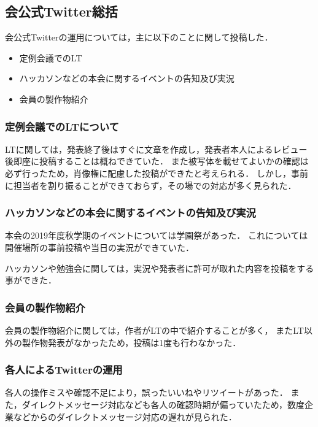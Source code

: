 \subsection*{会公式Twitter総括}


会公式Twitterの運用については，主に以下のことに関して投稿した．
\begin{itemize}
\item 定例会議でのLT
\item ハッカソンなどの本会に関するイベントの告知及び実況
\item 会員の製作物紹介
\end{itemize}

\subsubsection*{定例会議でのLTについて}
LTに関しては，発表終了後はすぐに文章を作成し，発表者本人によるレビュー後即座に投稿することは概ねできていた．
また被写体を載せてよいかの確認は必ず行ったため，肖像権に配慮した投稿ができたと考えられる．
しかし，事前に担当者を割り振ることができておらず，その場での対応が多く見られた．

\subsubsection*{ハッカソンなどの本会に関するイベントの告知及び実況}
本会の2019年度秋学期のイベントについては学園祭があった．
これについては開催場所の事前投稿や当日の実況ができていた．

ハッカソンや勉強会に関しては，実況や発表者に許可が取れた内容を投稿をする事ができた．

\subsubsection*{会員の製作物紹介}
会員の製作物紹介に関しては，作者がLTの中で紹介することが多く，
またLT以外の製作物発表がなかったため，投稿は1度も行わなかった．

\subsubsection*{各人によるTwitterの運用}
各人の操作ミスや確認不足により，誤ったいいねやリツイートがあった．
また，ダイレクトメッセージ対応なども各人の確認時期が偏っていたため，数度企業などからのダイレクトメッセージ対応の遅れが見られた．

